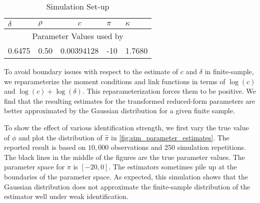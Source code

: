 \documentclass[11pt, letterpaper, twoside]{article}
\begin{document}
\begin{table}[htb]
 
 \centering
 \caption{Simulation Set-up}
 \label{tbl:simulationParameters}
 
 \begin{tabularx}{.65\textwidth}{X X c X X}

  \toprule
  $\delta$ & $\rho$ & $c$ & $\pi$ & $\kappa$ \\
  \midrule
  \multicolumn{5}{c}{Parameter Values used by \textcite{han2018leverage}} \\
  \midrule
  0.6475  & 0.50  & \num[scientific-notation=true]{.00394128} & -10 & 1.7680 \\
  \bottomrule
%
 \end{tabularx}

\end{table}

 
To avoid boundary issues with respect to the estimate of $c$ and $\delta$ in finite-sample, we reparameterize the moment conditions and link functions in terms of $\log(c)$ and $\log(c) + \log(\delta)$. This reparameterization forces them to be positive. We find that the resulting estimates for the transformed reduced-form parameters are better approximated by the Gaussian distribution for a given finite sample. 


To show the effect of various identification strength, we first vary the true value of $\phi$ and plot the distribution of $\widehat{\pi}$ in \cref{fig:sim_parameter_estimates}. The reported result is based on $10,000$ observations and \num{250} simulation repetitions. The black lines in the middle of the figures are the true parameter values. The parameter space for $\pi$ is $[-20, 0]$. The estimators sometimes pile up at the boundaries of the parameter space. As expected, this simulation shows that the Gaussian distribution does not approximate the finite-sample distribution of the estimator well under weak identification. 
\end{document}

